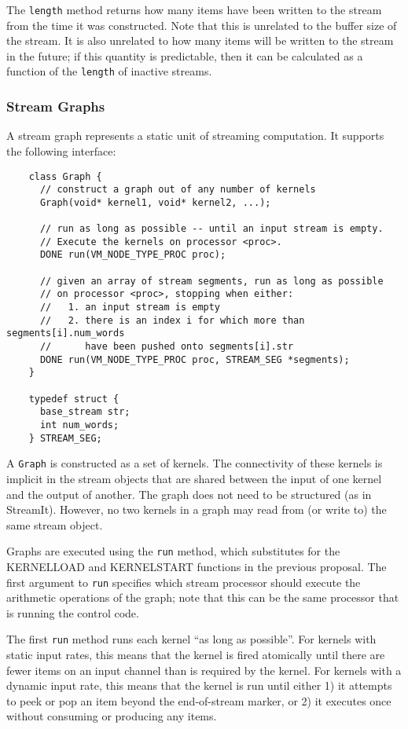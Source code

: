The {\tt length} method returns how many items have been written to
the stream from the time it was constructed.  Note that this is
unrelated to the buffer size of the stream.  It is also unrelated to
how many items will be written to the stream in the future; if this
quantity is predictable, then it can be calculated as a function of
the {\tt length} of inactive streams.

\subsubsection{Stream Graphs}
\label{sec:streamgraph}

A stream graph represents a static unit of streaming computation.  It
supports the following interface:
{\small
\begin{verbatim}
    class Graph {
      // construct a graph out of any number of kernels
      Graph(void* kernel1, void* kernel2, ...);

      // run as long as possible -- until an input stream is empty.  
      // Execute the kernels on processor <proc>.
      DONE run(VM_NODE_TYPE_PROC proc);

      // given an array of stream segments, run as long as possible
      // on processor <proc>, stopping when either:
      //   1. an input stream is empty
      //   2. there is an index i for which more than segments[i].num_words 
      //      have been pushed onto segments[i].str
      DONE run(VM_NODE_TYPE_PROC proc, STREAM_SEG *segments);
    }

    typedef struct {
      base_stream str;
      int num_words;
    } STREAM_SEG;
\end{verbatim}}

A {\tt Graph} is constructed as a set of kernels.  The connectivity of
these kernels is implicit in the stream objects that are shared
between the input of one kernel and the output of another.  The graph
does not need to be structured (as in StreamIt).  However, no two
kernels in a graph may read from (or write to) the same stream object.

Graphs are executed using the {\tt run} method, which substitutes for
the KERNELLOAD and KERNELSTART functions in the previous proposal.
The first argument to {\tt run} specifies which stream processor
should execute the arithmetic operations of the graph; note that this
can be the same processor that is running the control code.

The first {\tt run} method runs each kernel ``as long as possible''.
For kernels with static input rates, this means that the kernel is
fired atomically until there are fewer items on an input channel than
is required by the kernel.  For kernels with a dynamic input rate,
this means that the kernel is run until either 1) it attempts to peek
or pop an item beyond the end-of-stream marker, or 2) it executes once
without consuming or producing any items.

